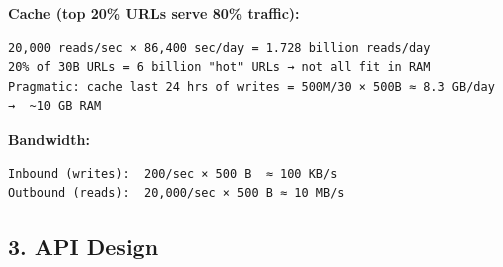 \documentclass[11pt]{article}
\begin{document}
\textbf{Cache (top 20\% URLs serve 80\% traffic):}

\setcodelang{}

\begin{verbatim}
20,000 reads/sec × 86,400 sec/day = 1.728 billion reads/day
20% of 30B URLs = 6 billion "hot" URLs → not all fit in RAM
Pragmatic: cache last 24 hrs of writes = 500M/30 × 500B ≈ 8.3 GB/day  →  ~10 GB RAM
\end{verbatim}

\textbf{Bandwidth:}

\setcodelang{}

\begin{verbatim}
Inbound (writes):  200/sec × 500 B  ≈ 100 KB/s
Outbound (reads):  20,000/sec × 500 B ≈ 10 MB/s
\end{verbatim}

\subsection{3. API Design}\label{3-api-design}

\end{document}
